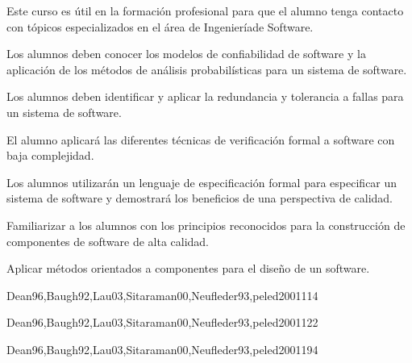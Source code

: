 \begin{syllabus}


\begin{justification}
Este curso es útil en la formación profesional para que el alumno tenga contacto con tópicos especializados  en el área de Ingenieríade Software.
\end{justification}

\begin{goals}
\item Los alumnos deben conocer los modelos de confiabilidad de software y la aplicación de los métodos de análisis probabilísticas para un sistema de software.
\item Los alumnos deben identificar y aplicar la redundancia y tolerancia a fallas para un sistema de software.
\item El alumno aplicará las diferentes técnicas de verificación formal a software con baja complejidad.
\item Los alumnos utilizarán un lenguaje de especificación formal para especificar un sistema de software y demostrará los beneficios de una perspectiva de calidad.
\item Familiarizar a los alumnos con los principios reconocidos para la construcción de componentes de software de alta calidad.
\item Aplicar métodos orientados a componentes para el diseño de un software.
\end{goals}

\begin{outcomes}
\end{outcomes}

\begin{unit}{\SESoftwareReliabilityDef}{Dean96,Baugh92,Lau03,Sitaraman00,Neufleder93,peled2001}{11}{4}
   \SESoftwareReliabilityAllTopics
   \SESoftwareReliabilityAllObjectives
\end{unit}

\begin{unit}{\SEFormalMethodsDef}{Dean96,Baugh92,Lau03,Sitaraman00,Neufleder93,peled2001}{12}{2}
   \SEFormalMethodsAllTopics
   \SEFormalMethodsAllObjectives
\end{unit}

\begin{unit}{\SEComponentBasedComputingDef}{Dean96,Baugh92,Lau03,Sitaraman00,Neufleder93,peled2001}{19}{4}
   \SEComponentBasedComputingAllTopics
   \SEComponentBasedComputingAllObjectives
\end{unit}



\begin{coursebibliography}
\end{coursebibliography}

\end{syllabus}
